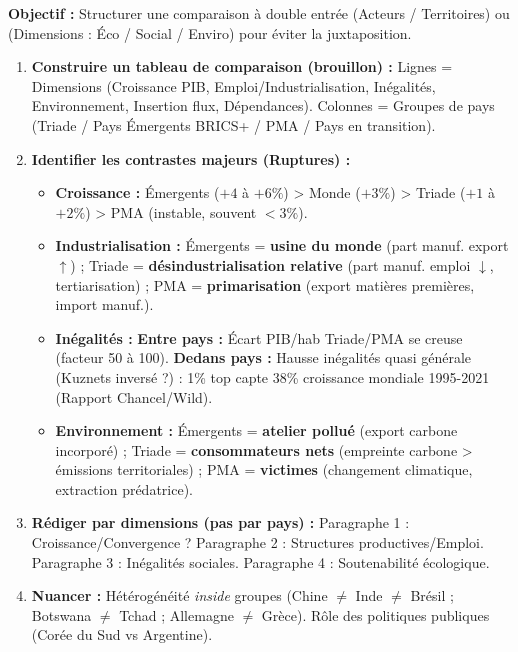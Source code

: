 \documentclass[11pt]{article}
\begin{document}
\begin{methode}
    \textbf{Objectif :} Structurer une comparaison à double entrée (Acteurs / Territoires) ou (Dimensions : Éco / Social / Enviro) pour éviter la juxtaposition.
    \begin{enumerate}
        \item \textbf{Construire un tableau de comparaison (brouillon) :} Lignes = Dimensions (Croissance PIB, Emploi/Industrialisation, Inégalités, Environnement, Insertion flux, Dépendances). Colonnes = Groupes de pays (Triade / Pays Émergents BRICS+ / PMA / Pays en transition).
        \item \textbf{Identifier les contrastes majeurs (Ruptures) :}
            \begin{itemize}
                \item \textbf{Croissance :} Émergents ($+4$ à $+6\%$) > Monde ($+3\%$) > Triade ($+1$ à $+2\%$) > PMA (instable, souvent $<3\%$).
                \item \textbf{Industrialisation :} Émergents = \textbf{usine du monde} (part manuf. export $\uparrow$) ; Triade = \textbf{désindustrialisation relative} (part manuf. emploi $\downarrow$, tertiarisation) ; PMA = \textbf{primarisation} (export matières premières, import manuf.).
                \item \textbf{Inégalités :} \textbf{Entre pays :} Écart PIB/hab Triade/PMA se creuse (facteur 50 à 100). \textbf{Dedans pays :} Hausse inégalités quasi générale (Kuznets inversé ?) : 1\% top capte 38\% croissance mondiale 1995-2021 (Rapport Chancel/Wild).
                \item \textbf{Environnement :} Émergents = \textbf{atelier pollué} (export carbone incorporé) ; Triade = \textbf{consommateurs nets} (empreinte carbone > émissions territoriales) ; PMA = \textbf{victimes} (changement climatique, extraction prédatrice).
            \end{itemize}
        \item \textbf{Rédiger par dimensions (pas par pays) :} Paragraphe 1 : Croissance/Convergence ? Paragraphe 2 : Structures productives/Emploi. Paragraphe 3 : Inégalités sociales. Paragraphe 4 : Soutenabilité écologique.
        \item \textbf{Nuancer :} Hétérogénéité \emph{inside} groupes (Chine $\neq$ Inde $\neq$ Brésil ; Botswana $\neq$ Tchad ; Allemagne $\neq$ Grèce). Rôle des politiques publiques (Corée du Sud vs Argentine).
    \end{enumerate}
\end{methode}
\end{document}
